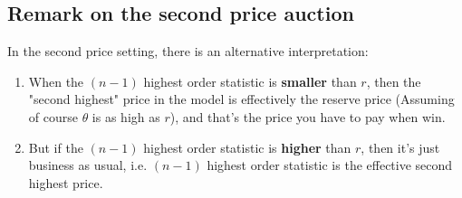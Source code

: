 \documentclass{tufte-handout}
\begin{document}
\subsection{Remark on the second price auction}

In the second price setting, there is an alternative interpretation:

\begin{enumerate}

    \item When the $(n-1)$ highest order statistic is \textbf{smaller} than $r$, then the "second highest" price in the model is effectively the reserve price (Assuming of course $\theta$ is as high as $r$), and that's the price you have to pay when win.
    
    \item But if the $(n-1)$ highest order statistic is \textbf{higher} than $r$, then it's just business as usual, i.e. $(n-1)$ highest order statistic is the effective second highest price.

\end{enumerate}

%
%
\end{document}
